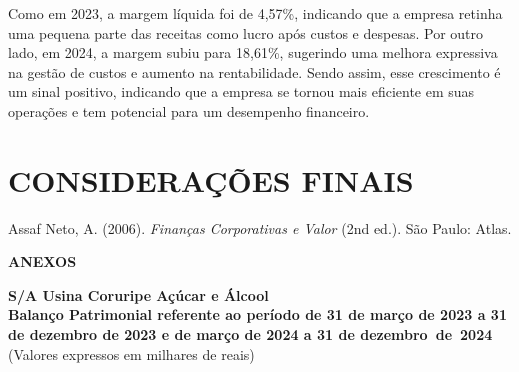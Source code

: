 \documentclass[1pt,a4paper]{article}
\begin{document}
	Como em 2023, a margem líquida foi de 4,57\%, indicando que a empresa retinha uma pequena parte das receitas como lucro após custos e despesas. Por outro lado, em 2024, a margem subiu para 18,61\%, sugerindo uma melhora expressiva na gestão de custos e aumento na rentabilidade. Sendo assim, esse crescimento é um sinal positivo, indicando que a empresa se tornou mais eficiente em suas operações e tem potencial para um desempenho financeiro.
	
	
	
	\section{CONSIDERAÇÕES FINAIS}
	
	\newpage
	
	\begin{thebibliography}{9}
		
		Assaf Neto, A. (2006).
		\textit{Finanças Corporativas e Valor} (2nd ed.).
		São Paulo: Atlas.
		
	\end{thebibliography}
	
	
	\newpage
	
	\centering \textbf{ANEXOS}
		
		\begin{center}
			\textbf{\Large S/A Usina Coruripe Açúcar e Álcool}\\
			\textbf{Balanço Patrimonial referente ao período de 31 de março de 2023 a 31 de dezembro de 2023 e de março de 2024 a 31 de dezembro de 2024}\\
			(Valores expressos em milhares de reais)
		\end{center}
		
		
		
\end{document}
